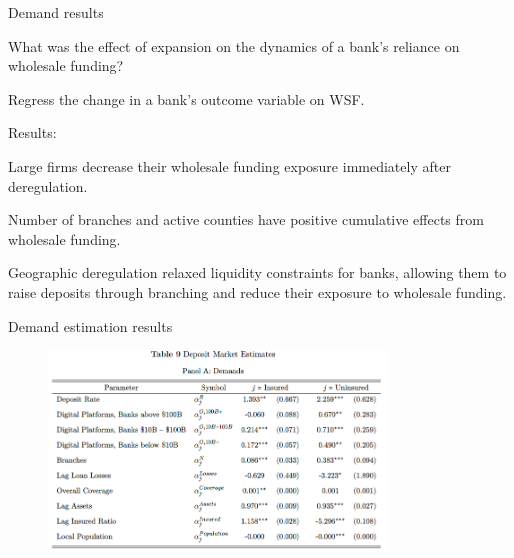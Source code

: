 \documentclass[notes,10pt, aspectratio=169]{beamer}
\newenvironment{wideitemize}{\itemize\addtolength{\itemsep}{10pt}}{\enditemize}
\begin{document}
        \begin{frame}{Demand results}\label{der_impact}
            \begin{wideitemize}
                \item What was the effect of expansion on the dynamics of a bank’s reliance on wholesale funding? %
                
                \item Regress the change in a bank's outcome variable on WSF. \hyperlink{der_impact1}{}
            \item Results:
            \vspace{0.2cm}
                \begin{wideitemize}
        \item Large firms decrease their wholesale funding
        exposure immediately after deregulation. %

        \item  Number of branches and active counties have positive cumulative effects from wholesale funding. 

        \item Geographic deregulation relaxed liquidity constraints for banks,
        allowing them to raise deposits through branching and reduce their exposure to wholesale
        funding. 

            \end{wideitemize}
                
            \end{wideitemize}

              
    \end{frame}
    

\begin{frame}{Demand estimation results}\label{demand_results1}


    \begin{figure}
        \centering
        \includegraphics[width=0.8\textwidth]{imgs/tab9.png}
    \end{figure}
    
    \end{frame}
\end{document}
